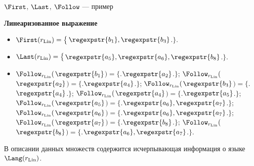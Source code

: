 \begin{frame}{$\First$, $\Last$, $\Follow$ --- пример}
{    \begin{exampleblock}{\bf Линеаризованное выражение}
        \begin{itemize}
            \item $\First(r_{\rm Lin})=\bigl\lbrace\bigr.${}$\regexpstr{b_{1}},\regexpstr{b_{3}}${}$\bigl.\bigr\rbrace$. %
            \item $\Last(r_{\rm Lin})=\bigl\lbrace\bigr.${}$\regexpstr{a_{5}},\regexpstr{a_{6}},\regexpstr{b_{8}}${}$\bigl.\bigr\rbrace$. %
            \item $\Follow_{r_{\rm Lin}}(${}$\regexpstr{b_{1}}${}$)=\bigl\lbrace\bigr.${}$\regexpstr{a_{2}}${}$\bigl.\bigr\rbrace$; $\Follow_{r_{\rm Lin}}(${}$\regexpstr{a_{2}}${}$)=\bigl\lbrace\bigr.${}$\regexpstr{a_{4}}${}$\bigl.\bigr\rbrace$; $\Follow_{r_{\rm Lin}}(${}$\regexpstr{b_{3}}${}$)=\bigl\lbrace\bigr.${}$\regexpstr{a_{4}}${}$\bigl.\bigr\rbrace$; $\Follow_{r_{\rm Lin}}(${}$\regexpstr{a_{4}}${}$)=\bigl\lbrace\bigr.${}$\regexpstr{a_{5}}${}$\bigl.\bigr\rbrace$; $\Follow_{r_{\rm Lin}}(${}$\regexpstr{a_{5}}${}$)=\bigl\lbrace\bigr.${}$\regexpstr{a_{6}},\regexpstr{a_{7}}${}$\bigl.\bigr\rbrace$; $\Follow_{r_{\rm Lin}}(${}$\regexpstr{a_{6}}${}$)=\bigl\lbrace\bigr.${}$\regexpstr{a_{6}},\regexpstr{a_{7}}${}$\bigl.\bigr\rbrace$; $\Follow_{r_{\rm Lin}}(${}$\regexpstr{a_{7}}${}$)=\bigl\lbrace\bigr.${}$\regexpstr{b_{8}}${}$\bigl.\bigr\rbrace$; $\Follow_{r_{\rm Lin}}(${}$\regexpstr{b_{8}}${}$)=\bigl\lbrace\bigr.${}$\regexpstr{a_{6}},\regexpstr{a_{7}}${}$\bigl.\bigr\rbrace$. %
        \end{itemize}
    \end{exampleblock}
    В описании данных множеств содержится исчерпывающая информация о языке $\Lang(r_{\rm Lin})$. %
    }
\end{frame}

